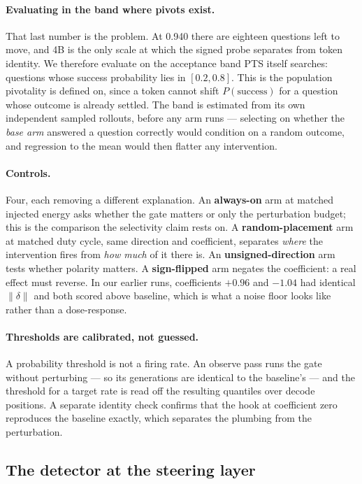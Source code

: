 \documentclass{article}
\begin{document}
\paragraph{Evaluating in the band where pivots exist.} That last number is
the problem. At 0.940 there are eighteen questions left to move, and 4B is
the only scale at which the signed probe separates from token identity. We
therefore evaluate on the acceptance band PTS itself searches: questions
whose success probability lies in $[0.2, 0.8]$. This is the population
pivotality is defined on, since a token cannot shift $P(\text{success})$
for a question whose outcome is already settled. The band is estimated
from its own independent sampled rollouts, before any arm runs ---
selecting on whether the \emph{base arm} answered a question correctly
would condition on a random outcome, and regression to the mean would then
flatter any intervention.

\paragraph{Controls.} Four, each removing a different explanation. An
\textbf{always-on} arm at matched injected energy asks whether the gate
matters or only the perturbation budget; this is the comparison the
selectivity claim rests on. A \textbf{random-placement} arm at matched duty
cycle, same direction and coefficient, separates \emph{where} the
intervention fires from \emph{how much} of it there is. An
\textbf{unsigned-direction} arm tests whether polarity matters. A
\textbf{sign-flipped} arm negates the coefficient: a real effect must
reverse. In our earlier runs, coefficients $+0.96$ and $-1.04$ had
identical $\|\delta\|$ and both scored above baseline, which is what a
noise floor looks like rather than a dose-response.

\paragraph{Thresholds are calibrated, not guessed.} A probability
threshold is not a firing rate. An observe pass runs the gate without
perturbing --- so its generations are identical to the baseline's --- and
the threshold for a target rate is read off the resulting quantiles over
decode positions. A separate identity check confirms that the hook at
coefficient zero reproduces the baseline exactly, which separates the
plumbing from the perturbation.

\subsection{The detector at the steering layer}
\label{sec:gatestrength}
\end{document}
